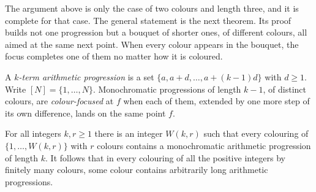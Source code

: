 The argument above is only the case of two colours and length three, and it is complete for that case. The general statement is the next theorem. Its proof builds not one progression but a bouquet of shorter ones, of different colours, all aimed at the same next point. When every colour appears in the bouquet, the focus completes one of them no matter how it is coloured.

A \emph{$k$-term arithmetic progression} is a set $\{a,a+d,\ldots,a+(k-1)d\}$ with $d\ge 1$. Write $[N]=\{1,\ldots,N\}$. Monochromatic progressions of length $k-1$, of distinct colours, are \emph{colour-focused} at $f$ when each of them, extended by one more step of its own difference, lands on the same point $f$.

\begin{theorem}\label{thm:vdw}
For all integers $k,r\ge 1$ there is an integer $W(k,r)$ such that every colouring of $\{1,\ldots,W(k,r)\}$ with $r$ colours contains a monochromatic arithmetic progression of length $k$. It follows that in every colouring of all the positive integers by finitely many colours, some colour contains arbitrarily long arithmetic progressions.
\end{theorem}
